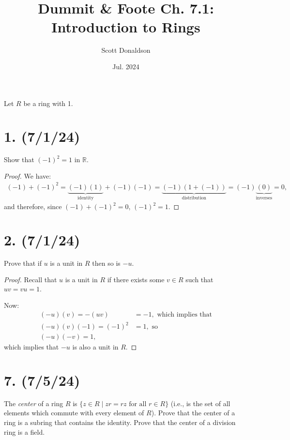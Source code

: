 \documentclass{article}
\title{Dummit \& Foote Ch. 7.1: Introduction to Rings}
\author{Scott Donaldson}
\date{Jul. 2024}
\begin{document}
\maketitle

Let $R$ be a ring with 1.

\section*{1. (7/1/24)}

Show that $(-1)^2 = 1$ in $\mathbb{R}$.

\begin{proof}
    We have:
    \begin{align*}
        (-1) + (-1)^2 = \underbrace{(-1)(1)}_{\text{identity}} + (-1)(-1) = \underbrace{(-1)(1 + (-1))}_{\text{distribution}} = (-1)\underbrace{(0)}_{\text{inverses}} = 0,
    \end{align*}
    and therefore, since $(-1) + (-1)^2 = 0$, $(-1)^2 = 1$.
\end{proof}

\section*{2. (7/1/24)}

Prove that if $u$ is a unit in $R$ then so is $-u$.

\begin{proof}
    Recall that $u$ is a unit in $R$ if there exists some $v \in R$ such that $uv = vu = 1$.

    Now:
    \begin{align*}
        (-u)(v) = -(uv) &= -1, \text{ which implies that} \\
        (-u)(v)(-1) = (-1)^2 &= 1, \text{ so} \\
        (-u)(-v) = 1,
    \end{align*}
    which implies that $-u$ is also a unit in $R$.
\end{proof}

\section*{7. (7/5/24)}

The \emph{center} of a ring $R$ is $\{ z \in R \mid zr = rz \text{ for all } r \in R \}$ (i.e., is the set of all elements which commute with every element of $R$). Prove that the center of a ring is a subring that contains the identity. Prove that the center of a division ring is a field.
\end{document}

